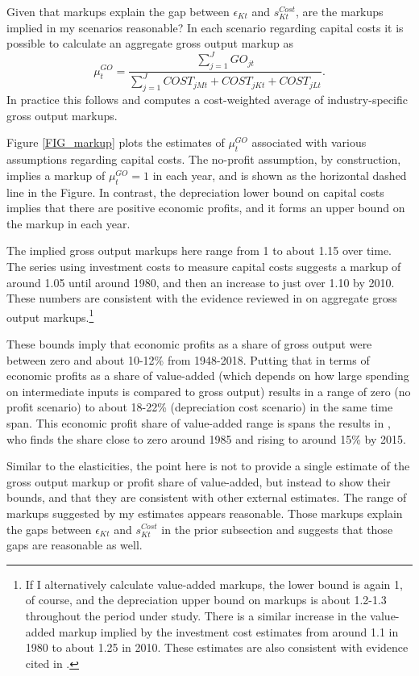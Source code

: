 Given that markups explain the gap between $\epsilon_{Kt}$ and $s^{Cost}_{Kt}$, are the markups implied in my scenarios reasonable? In each scenario regarding capital costs it is possible to calculate an aggregate gross output markup as
\begin{equation}
    \mu^{GO}_{t} = \frac{\sum_{j=1}^{J} GO_{jt}}{\sum_{j=1}^J COST_{jMt} + COST_{jKt} + COST_{jLt}}. \label{EQ_markup}
\end{equation}
In practice this follows \cite{edmondetal2018} and computes a cost-weighted average of industry-specific gross output markups.

Figure \ref{FIG_markup} plots the estimates of $\mu^{GO}_t$ associated with various assumptions regarding capital costs. The no-profit assumption, by construction, implies a markup of $\mu^{GO}_t = 1$ in each year, and is shown as the horizontal dashed line in the Figure. In contrast, the depreciation lower bound on capital costs implies that there are positive economic profits, and it forms an upper bound on the markup in each year.

The implied gross output markups here range from 1 to about 1.15 over time. The series using investment costs to measure capital costs suggests a markup of around 1.05 until around 1980, and then an increase to just over 1.10 by 2010. These numbers are consistent with the evidence reviewed in \cite{basu2019} on aggregate gross output markups.\footnote{If I alternatively calculate value-added markups, the lower bound is again 1, of course, and the depreciation upper bound on markups is about 1.2-1.3 throughout the period under study. There is a similar increase in the value-added markup implied by the investment cost estimates from around 1.1 in 1980 to about 1.25 in 2010. These estimates are also consistent with evidence cited in \cite{basu2019}.}

These bounds imply that economic profits as a share of gross output were between zero and about 10-12\% from 1948-2018. Putting that in terms of economic profits as a share of value-added (which depends on how large spending on intermediate inputs is compared to gross output) results in a range of zero (no profit scenario) to about 18-22\% (depreciation cost scenario) in the same time span. This economic profit share of value-added range is spans the results in \cite{Barkai000}, who finds the share close to zero around 1985 and rising to around 15\% by 2015. 

Similar to the elasticities, the point here is not to provide a single estimate of the gross output markup or profit share of value-added, but instead to show their bounds, and that they are consistent with other external estimates. The range of markups suggested by my estimates appears reasonable. Those markups explain the gaps between $\epsilon_{Kt}$ and $s^{Cost}_{Kt}$ in the prior subsection and suggests that those gaps are reasonable as well.




